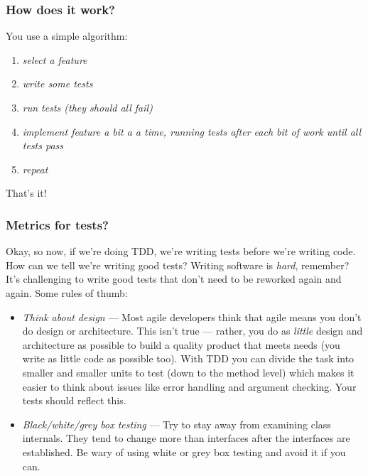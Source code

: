\documentclass[t, 10pt]{beamer}
\begin{document}
\begin{frame}
\frametitle{How does it work?}
You use a simple algorithm:
\begin{enumerate}
\item \textit{select a feature}
\newline
\item \textit{write some tests}
\newline
\item \textit{run tests (they should all fail)}
\newline
\item \textit{implement feature a bit a a time, running tests after each bit of work until all tests pass}
\newline
\item \textit{repeat}
\end{enumerate}
That's it!
\end{frame}

\begin{frame}
\frametitle{Metrics for tests?}
Okay, so now, if we're doing TDD, we're writing tests before we're writing code.  How can we tell we're writing good tests?
\newline
\newline
Writing software is \textit{hard}, remember? It's challenging to write good tests that don't need to be reworked again and again.  Some rules of thumb:
\begin{itemize}
\item \textit{Think about design} --- Most agile developers think that agile means you don't do design or architecture.  This isn't true --- rather, you do as \textit{little} design and architecture as possible to build a quality product that meets needs (you write as little code as possible too).  With TDD you can divide the task into smaller and smaller units to test (down to the method level) which makes it easier to think about issues like error handling and argument checking.  Your tests should reflect this.
\item \textit{Black/white/grey box testing} --- Try to stay away from examining class internals.  They tend to change more than interfaces after the interfaces are established.  Be wary of using white or grey box testing and avoid it if you can.
\end{itemize}
\end{frame}
\end{document}
